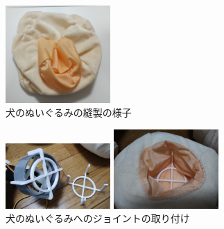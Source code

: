 \documentclass[uplatex,a4paper,12pt]{jsarticle}
\begin{document}
\begin{figure}[htbp]
\begin{minipage}[c]{0.48\linewidth}
  \end{minipage}
  \begin{minipage}[c]{0.48\linewidth}
    \centering
    \includegraphics[keepaspectratio,width=4cm,clip]{images/mohukawa/saw_04.jpg}
  \end{minipage}
  \caption{犬のぬいぐるみの縫製の様子}
  \label{fig:mohukawa:saw}
\end{figure}

\begin{figure}[htbp]
  \centering
  \begin{minipage}[c]{0.48\linewidth}
    \centering
    \includegraphics[keepaspectratio,width=4cm,clip]{images/mohukawa/joint_01.jpg}
  \end{minipage}
  \begin{minipage}[c]{0.48\linewidth}
    \centering
    \includegraphics[keepaspectratio,width=4cm,clip]{images/mohukawa/joint_02.jpg}
  \end{minipage}
  \caption{犬のぬいぐるみへのジョイントの取り付け}
  \label{fig:mohukawa:joint}
\end{figure}
\end{document}
